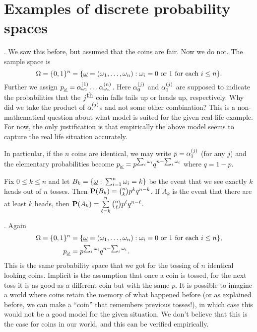\documentclass[preprint,  11pt]{amsart}
\def\omeg{\underline{\ome}}
\begin{document}
\section{Examples of discrete probability spaces}
\begin{example} . We saw this before, but assumed that the coins are fair. Now we do not. The sample space is
$$
\Ome=\{0,1\}^{n}=\{\omeg=(\ome_{1},\ldots ,\ome_{n})\suchthat \ome_{i}=0 \mb{ or } 1 \mb{ for each }i\le n\}.
$$
Further we assign $p_{\omeg}=\alp_{\ome_{1}}^{(1)}\ldots \alp_{\ome_{n}}^{(n)}$. Here $\alp_{0}^{(j)}$ and $\alp_{1}^{(j)}$ are supposed to indicate the probabilities that the $j^{\mb{th}}$ coin falls tails up or heads up, respectively. Why did we take the product of $\alp^{(j)}_{\cdot}$s and not some other combination? This is a non-mathematical question about what model is suited for the given real-life example. For now, the only justification is that empirically the above model seems to capture the real life situation accurately.

In particular, if the $n$ coins are identical, we may write $p=\alp_{1}^{(j)}$ (for any $j$) and the elementary probabilities become  $p_{\omeg}=p^{\sum_{i}\ome_{i}}q^{n-\sum_{i}\ome_{i}}$ where $q=1-p$.

Fix $0\le k\le n$ and let $B_{k}=\{\omeg\suchthat \sum_{i=1}^{n}\ome_{i}=k\}$ be the event that we see exactly $k$ heads out of $n$ tosses. Then $\P(B_{k})=\binom{n}{k}p^{k}q^{n-k}$. If $A_{k}$ is the event that there are at least $k$ heads, then
$\P(A_{k})=\summ_{\ell=k}^{n}\binom{n}{\ell}p^{\ell}q^{n-\ell}$.
\end{example}

\begin{example} . Again
\begin{align*}
\Ome=\{0,1\}^{n}&=\{\omeg=(\ome_{1},\ldots ,\ome_{n})\suchthat \ome_{i}=0 \mb{ or } 1 \mb{ for each }i\le n\}, \\
p_{\omeg}&=p^{\sum_{i}\ome_{i}}q^{n-\sum_{i}\ome_{i}}.
\end{align*}
This is the same probability space that we got for the tossing of $n$ identical looking coins. Implicit is the assumption that once a coin is tossed, for the next toss it is as good as a different coin but with the same $p$. It is possible to imagine a world where coins retain the memory of what happened before (or as explained before, we can make a ``coin'' that remembers previous tosses!), in which case this would not be a good model for the given situation. We don't believe that this is the case for coins in our world, and this can be verified empirically.
\end{example}
\end{document}
